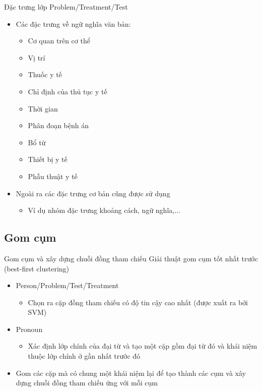 \begin{frame}{Đặc trưng lớp Problem/Treatment/Test}
\putlogo
\begin{itemize}
	\item Các đặc trưng về {\color{red} ngữ nghĩa} văn bản:
	\begin{itemize}
		\item Cơ quan trên cơ thể
		\item Vị trí
		\item Thuốc y tế
		\item Chỉ định của thủ tục y tế
		\item Thời gian
		\item Phân đoạn bệnh án
		\item Bổ từ
		\item Thiết bị y tế
		\item Phẫu thuật y tế
	\end{itemize}
	\item Ngoài ra các đặc trưng cơ bản cũng được sử dụng
	\begin{itemize}
		\item Ví dụ nhóm đặc trưng khoảng cách, ngữ nghĩa,...
	\end{itemize}
\end{itemize}
\end{frame}

\subsection{Gom cụm}
\begin{frame}{Gom cụm và xây dựng chuỗi đồng tham chiếu}
\putlogo
Giải thuật gom cụm tốt nhất trước (best-first clustering)
\begin{itemize}
	\item Person/Problem/Test/Treatment
	\begin{itemize}
		\item Chọn ra cặp đồng tham chiếu có độ tin cậy cao nhất (được xuất ra bởi SVM)
	\end{itemize} 
	\item Pronoun
	\begin{itemize}
		\item Xác định lớp chính của đại từ và tạo một cặp gồm đại từ đó và khái niệm thuộc lớp chính ở gần nhất trước đó
	\end{itemize}
	\item Gom các cặp mà có chung một khái niệm lại để tạo thành các cụm và xây dựng chuỗi đồng tham chiếu ứng với mỗi cụm
\end{itemize}
\end{frame}
